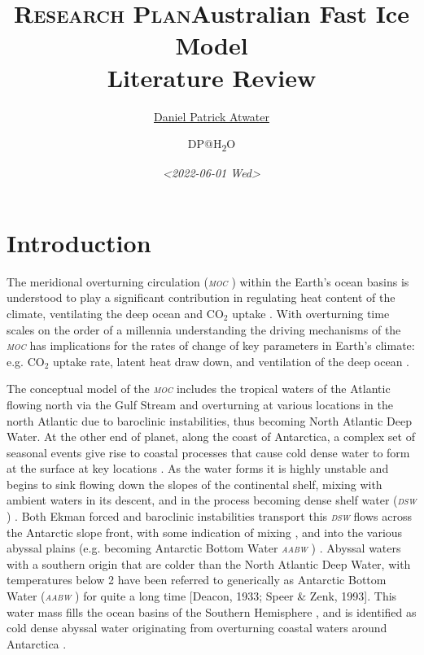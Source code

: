 \documentclass[11pt,a4paper]{article}
\title{\textsc{Research Plan}}
\author{\href{mailto:daniel.atwater@utas.edu.au}{Daniel Patrick Atwater}}
\author{DP@H\textsubscript{2}O}
\date{\textit{<2022-06-01 Wed>}}
\title{Australian Fast Ice Model\\\medskip
\large Literature Review}
\newcommand{\cotwo}{CO$_2$ }
\newcommand{\moc}{\textit{\textsc{moc }}} %
\newcommand{\dsw}{\textit{\textsc{{dsw }}}} %
\newcommand{\aabw}{\textit{\textsc{{aabw }}}} %
\begin{document}
\maketitle
\tableofcontents


\section{Introduction}
\label{sec:org08c5a1a}

The meridional overturning circulation (\moc) within the Earth's ocean
basins is understood to play a significant contribution in regulating
heat content of the climate, ventilating the deep ocean and \cotwo uptake
\citep{orsiCirculationMixingProduction1999,levitusWarmingWorldOcean2005,bindoffObservationsOceanicClimate2007,purkeyWarmingGlobalAbyssal2010,talleyClosureGlobalOverturning2013}. With
overturning time scales on the order of a millennia \citep{johnsonQuantifyingAntarcticBottom2008}
understanding the driving mechanisms of the \moc has implications for
the rates of change of key parameters in Earth's climate: e.g. \cotwo uptake rate, latent heat draw down, and ventilation of the deep ocean
\citep{bindoffObservationsOceanicClimate2007,purkeyWarmingGlobalAbyssal2010}. 

The conceptual model of the \moc includes the tropical waters of the
Atlantic flowing north via the Gulf Stream and overturning at various
locations in the north Atlantic due to baroclinic instabilities, thus
becoming North Atlantic Deep Water. At the other end of planet, along
the coast of Antarctica, a complex set of seasonal events give rise to
coastal processes that cause cold dense water to form at the surface
at key locations \citep{orsiCirculationMixingProduction1999}. As the water forms it is
highly unstable and begins to sink flowing down the slopes of the
continental shelf, mixing with ambient waters in its descent, and in
the process becoming dense shelf water (\dsw) \citep{orsiCirculationMixingProduction1999}. Both
Ekman forced and baroclinic instabilities transport
\citep{orsiCirculationMixingProduction1999} this \dsw flows across the Antarctic slope front,
with some indication of mixing
\citep{mizutaSeasonalEvolutionCape2021,vanachterModellingLandfastSea2022,rintoulOceanHeatDrives2016}, and into the various
abyssal plains (e.g. becoming Antarctic Bottom Water \textemdash
\aabw) \citep{stewartAccelerationOverturningAntarctic2019}. Abyssal
waters with a southern origin that are colder than the North Atlantic
Deep Water, with temperatures below \si{2}{\degress\Celisus} have been referred to
generically as Antarctic Bottom Water (\aabw) for quite a long time [Deacon,
1933; Speer \& Zenk, 1993]. This water mass fills the ocean basins of
the Southern Hemisphere \citep{johnsonQuantifyingAntarcticBottom2008}, and is identified as cold
dense abyssal water originating from overturning coastal waters around
Antarctica \citep{orsiCirculationMixingProduction1999}. 
\end{document}
